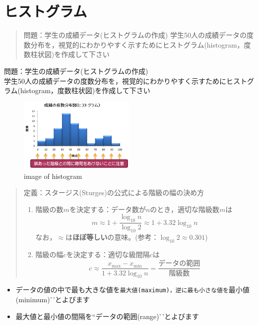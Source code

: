 \documentclass[
]{book}
\providecommand{\tightlist}{%
  \setlength{\itemsep}{0pt}\setlength{\parskip}{0pt}}
\theoremstyle{definition}
\theoremstyle{definition}
\theoremstyle{definition}
\theoremstyle{definition}
\theoremstyle{remark}
\begin{document}
\hypertarget{ux30d2ux30b9ux30c8ux30b0ux30e9ux30e0}{%
\section{ヒストグラム}\label{ux30d2ux30b9ux30c8ux30b0ux30e9ux30e0}}

\begin{quote}
問題：学生の成績データ(ヒストグラムの作成)
学生50人の成績データの度数分布を，視覚的にわかりやすく示すためにヒストグラム(histogram，度数柱状図)を作成して下さい
\end{quote}

問題：学生の成績データ(ヒストグラムの作成) \\
学生50人の成績データの度数分布を，視覚的にわかりやすく示すためにヒストグラム(histogram，度数柱状図)を作成して下さい

\begin{figure}
\centering
\includegraphics[width=0.5\textwidth,height=\textheight]{images/lec02/pic_hist_scores.png}
\caption{image of histogram}
\end{figure}

\begin{quote}
定義：スタージス(Sturges)の公式による階級の幅の決め方

\begin{enumerate}
\def\labelenumi{\arabic{enumi}.}
\tightlist
\item
  階級の数\(m\)を決定する：データ数が\(n\)のとき，適切な階級数\(m\)は
  \[
  m \approx 1+\frac{\log_{10} n}{\log_{10} 2} \approx 1+3.32 \log_{10} n
  \]
  なお，\(\approx\)は\textbf{ほぼ等しい}の意味。(参考：\(\log_{10} 2 \approx 0.301\))
\item
  階級の幅\(c\)を決定する：適切な級間隔\(c\)は
  \[
  c \approx \frac{x_{\max}-x_{\min}}{1+3.32 \log_{10} n}=\frac{\text{データの範囲}}{\text{階級数}}
  \]
\end{enumerate}
\end{quote}

\begin{itemize}
\tightlist
\item
  データの値の中で最も大きな値を\texttt{最大値(maximum)\textquotesingle{}\textquotesingle{}，逆に最も小さな値を}最小値(minimum)'\,'とよびます
\item
  最大値と最小値の間隔を``データの範囲(range)'\,'とよびます
\end{itemize}
\end{document}
